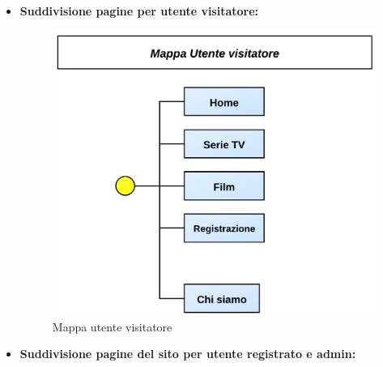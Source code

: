 \begin{itemize}

\item \textbf{Suddivisione pagine per utente visitatore:}

\begin{center}
\begin{figure}[H]
\centering
\includegraphics[scale=0.60]{images/mapVisitatore.png}
\caption{Mappa utente visitatore}
\end{figure}
\end{center}


\item \textbf{Suddivisione pagine del sito per utente registrato e admin:}


\end{itemize}
